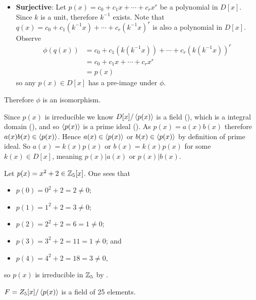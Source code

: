 \begin{questions}
\begin{itemize}
        \item \textbf{Surjective}: Let $p(x) = c_0 + c_1x + \cdots + c_rx^r$ be a polynomial in $D[x]$. Since $k$ is a unit, therefore $k^{-1}$ exists. Note that $q(x) = c_0 + c_1(k^{-1}x) + \cdots + c_r(k^{-1}x)^r$ is also a polynomial in $D[x]$. Observe
        \begin{align*}
            \phi(q(x)) &= c_0 + c_1(k(k^{-1}x)) + \cdots + c_r(k(k^{-1}x))^r\\
            &= c_0 + c_1x + \cdots + c_rx^r\\
            &= p(x)
        \end{align*}
        so any $p(x) \in D[x]$ has a pre-image under $\phi$.
    \end{itemize}
    Therefore $\phi$ is an isomorphism.

    \item Since $p(x)$ is irreducible we know $D[x]/\left\langle p(x)\right\rangle$ is a field (), which is a integral domain (), and so $\left\langle p(x)\right\rangle$ is a prime ideal (). As $p(x) = a(x)b(x)$ therefore $a(x)b(x) \in \left\langle p(x)\right\rangle$. Hence $a(x) \in \left\langle p(x)\right\rangle$ or $b(x) \in \left\langle p(x)\right\rangle$ by definition of prime ideal. So $a(x) = k(x)p(x)$ or $b(x) = k(x)p(x)$ for some $k(x) \in D[x]$, meaning $p(x) \vert a(x)$ or $p(x) \vert b(x)$.

    \item \begin{partquestions}{\roman*}
        \item Let $p(x) = x^2 + 2 \in \mathbb{Z}_5[x]$. One sees that
        \begin{itemize}
            \item $p(0) = 0^2 + 2 = 2 \neq 0$;
            \item $p(1) = 1^2 + 2 = 3 \neq 0$;
            \item $p(2) = 2^2 + 2 = 6 = 1 \neq 0$;
            \item $p(3) = 3^2 + 2 = 11 = 1 \neq 0$; and
            \item $p(4) = 4^2 + 2 = 18 = 3 \neq 0$,
        \end{itemize}
        so $p(x)$ is irreducible in $\mathbb{Z}_5$ by .

        \item $F = Z_5[x]/\left\langle p(x)\right\rangle$ is a field of 25 elements.


\end{partquestions}
\end{questions}
